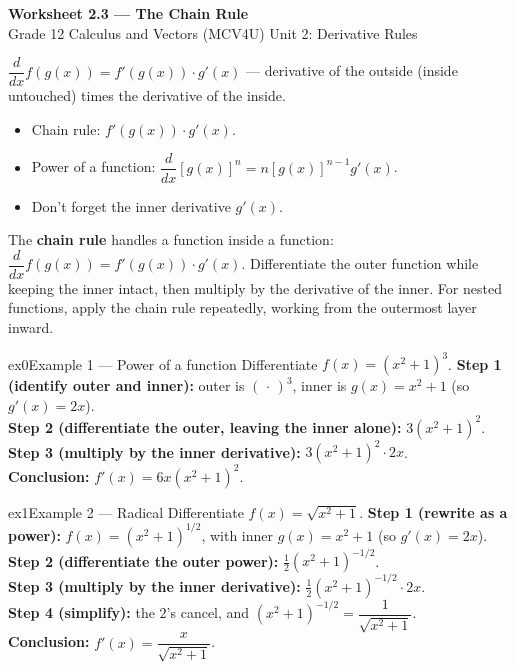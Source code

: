 \documentclass[11pt]{article}
\begin{document}
\begin{center}
{\LARGE\bfseries\color{titleblue}Worksheet 2.3 --- The Chain Rule}\\[2pt]
{\small Grade 12 Calculus and Vectors (MCV4U) \textperiodcentered{} Unit 2: Derivative Rules}
\end{center}

\begin{ideabox}
$\dfrac{d}{dx}f(g(x))=f'(g(x))\cdot g'(x)$ — derivative of the outside (inside untouched) times the derivative of the inside.
\begin{itemize}[leftmargin=*,itemsep=2pt]
  \item Chain rule: $f'(g(x))\cdot g'(x)$.
  \item Power of a function: $\dfrac{d}{dx}[g(x)]^n=n[g(x)]^{n-1}g'(x)$.
  \item Don't forget the inner derivative $g'(x)$.
\end{itemize}
\end{ideabox}

\begin{learnbox}
The \textbf{chain rule} handles a function inside a function: $\dfrac{d}{dx}f(g(x))=f'(g(x))\cdot g'(x)$.
Differentiate the outer function while keeping the inner intact, then multiply by the derivative of the inner.
For nested functions, apply the chain rule repeatedly, working from the outermost layer inward.
\end{learnbox}


\begin{example}{ex0}{Example 1 --- Power of a function}
Differentiate $f(x)=(x^2+1)^3$.\soln
\textbf{Step 1 (identify outer and inner):} outer is $(\,\cdot\,)^3$, inner is $g(x)=x^2+1$ (so $g'(x)=2x$).\\[3pt]
\textbf{Step 2 (differentiate the outer, leaving the inner alone):} $3(x^2+1)^2$.\\[3pt]
\textbf{Step 3 (multiply by the inner derivative):} $3(x^2+1)^2\cdot2x$.\\[3pt]
\textbf{Conclusion:} $f'(x)=6x(x^2+1)^2$.
\end{example}

\begin{example}{ex1}{Example 2 --- Radical}
Differentiate $f(x)=\sqrt{x^2+1}$.\soln
\textbf{Step 1 (rewrite as a power):} $f(x)=(x^2+1)^{1/2}$, with inner $g(x)=x^2+1$ (so $g'(x)=2x$).\\[3pt]
\textbf{Step 2 (differentiate the outer power):} $\tfrac12(x^2+1)^{-1/2}$.\\[3pt]
\textbf{Step 3 (multiply by the inner derivative):} $\tfrac12(x^2+1)^{-1/2}\cdot2x$.\\[3pt]
\textbf{Step 4 (simplify):} the $2$'s cancel, and $(x^2+1)^{-1/2}=\dfrac1{\sqrt{x^2+1}}$.\\[3pt]
\textbf{Conclusion:} $f'(x)=\dfrac{x}{\sqrt{x^2+1}}$.
\end{example}
\end{document}
